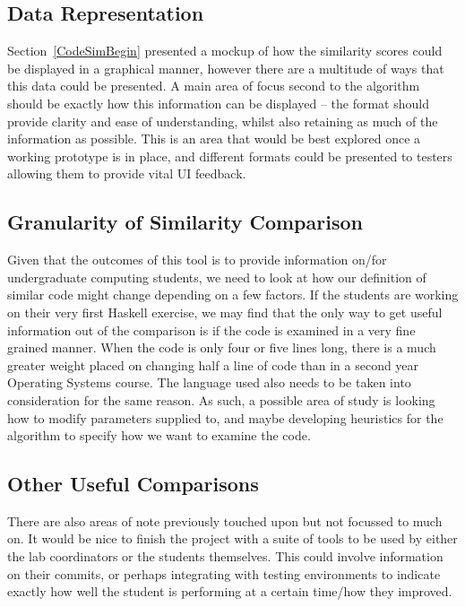 \subsection{Data Representation}

Section~\ref{CodeSimBegin} presented a mockup of how the similarity scores could
be displayed in a graphical manner, however there are a multitude of ways that
this data could be presented. A main area of focus second to the algorithm should
be exactly how this information can be displayed -- the format should provide
clarity and ease of understanding, whilst also retaining as much of the information
as possible. This is an area that would be best explored once a working prototype
is in place, and different formats could be presented to testers allowing them
to provide vital UI feedback.

\subsection{Granularity of Similarity Comparison}
\label{subsec:SimGranularity}

Given that the outcomes of this tool is to provide information on/for undergraduate
computing students, we need to look at how our definition of similar code might
change depending on a few factors. If the students are working on their very first
Haskell exercise, we may find that the only way to get useful information out
of the comparison is if the code is examined in a very fine grained manner. When
the code is only four or five lines long, there is a much greater weight placed
on changing half a line of code than in a second year Operating Systems course.
The language used also needs to be taken into consideration for the same reason.
As such, a possible area of study is looking how to modify parameters supplied
to, and maybe developing heuristics for the algorithm to specify how we want
to examine the code.

\subsection{Other Useful Comparisons}

There are also areas of note previously touched upon but not focussed to much on.
It would be nice to finish the project with a suite of tools to be used by either
the lab coordinators or the students themselves. This could involve information
on their commits, or perhaps integrating with testing environments to indicate
exactly how well the student is performing at a certain time/how they improved.